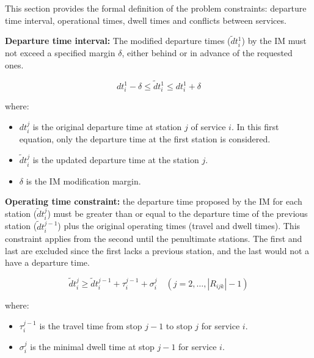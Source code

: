 \documentclass[Afour,sagev,times]{sagej}
\begin{document}
This section provides the formal definition of the problem constraints: departure time interval, operational times, dwell times and conflicts between services.

\textbf{Departure time interval:} The modified departure times ($  \tilde dt_{i}^{1} $) by the \gls{IM} must not exceed a specified margin $\delta$, either behind or in advance of the requested ones.

\begin{equation}
    dt_{i}^{1} - \delta \leq \tilde dt_{i}^{1} \leq dt_{i}^{1} + \delta
\end{equation}

where:
\begin{itemize}
  \item $dt_{i}^{j}$ is the original departure time at station $j$ of service $i$. In this first equation, only the departure time at the first station is considered.
  \item $\tilde dt_{i}^{j}$ is the updated departure time at the station $ j $.
  \item $\delta$ is the \gls{IM} modification margin.
\end{itemize}

\textbf{Operating time constraint:} the departure time proposed by the \gls{IM} for each station ($ \tilde dt_{i}^{j} $) must be greater than or equal to the departure time of the previous station ($ \tilde dt_{i}^{j-1} $) plus the original operating times (travel and dwell times). This constraint applies from the second until the penultimate stations. The first and last are excluded since the first lacks a previous station, and the last would not a have a departure time.

\begin{equation}
\tilde dt_{i}^{j} \geq \tilde dt_{i}^{j-1} + \tau_{i}^{j-1} + \sigma_{i}^{j}
\quad
(j=2,\dots, |R_{ijk}| - 1)
\label{eq:operational}
\end{equation}

where:
\begin{itemize}
  \item $ \tau_{i}^{j-1}$ is the travel time from stop $j-1$ to stop $j$ for service $i$.
  \item $\sigma_{i}^{j}$ is the minimal dwell time at stop $j-1$ for service $i$.
\end{itemize}
\end{document}
